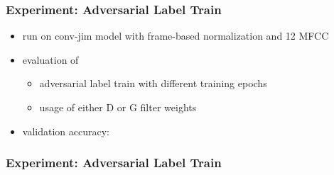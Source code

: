 \begin{frame}
  \frametitle{Experiment: Adversarial Label Train}
  \begin{itemize}
    \item run on conv-jim model with frame-based normalization and 12 MFCC
    \item evaluation of
    \begin{itemize}
     \item adversarial label train with different training epochs
     \item usage of either D or G filter weights
    \end{itemize}
    \item validation accuracy:
    \vspace{-0.5cm}
    \begin{figure}[!ht]
    \centering
    \end{figure}
  \end{itemize}
\end{frame}

\begin{frame}
  \frametitle{Experiment: Adversarial Label Train}
  \centering \vfill
  
\end{frame}

